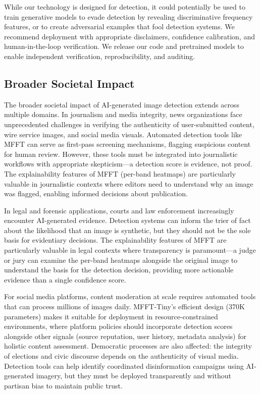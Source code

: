 \documentclass[journal]{IEEEtran}
\begin{document}
While our technology is designed for detection, it could potentially be used to train generative models to evade detection by revealing discriminative frequency features, or to create adversarial examples that fool detection systems. We recommend deployment with appropriate disclaimers, confidence calibration, and human-in-the-loop verification. We release our code and pretrained models to enable independent verification, reproducibility, and auditing.

\subsection{Broader Societal Impact}
The broader societal impact of AI-generated image detection extends across multiple domains. In journalism and media integrity, news organizations face unprecedented challenges in verifying the authenticity of user-submitted content, wire service images, and social media visuals. Automated detection tools like MFFT can serve as first-pass screening mechanisms, flagging suspicious content for human review. However, these tools must be integrated into journalistic workflows with appropriate skepticism---a detection score is evidence, not proof. The explainability features of MFFT (per-band heatmaps) are particularly valuable in journalistic contexts where editors need to understand why an image was flagged, enabling informed decisions about publication.

In legal and forensic applications, courts and law enforcement increasingly encounter AI-generated evidence. Detection systems can inform the trier of fact about the likelihood that an image is synthetic, but they should not be the sole basis for evidentiary decisions. The explainability features of MFFT are particularly valuable in legal contexts where transparency is paramount---a judge or jury can examine the per-band heatmaps alongside the original image to understand the basis for the detection decision, providing more actionable evidence than a single confidence score.

For social media platforms, content moderation at scale requires automated tools that can process millions of images daily. MFFT-Tiny's efficient design (370K parameters) makes it suitable for deployment in resource-constrained environments, where platform policies should incorporate detection scores alongside other signals (source reputation, user history, metadata analysis) for holistic content assessment. Democratic processes are also affected: the integrity of elections and civic discourse depends on the authenticity of visual media. Detection tools can help identify coordinated disinformation campaigns using AI-generated imagery, but they must be deployed transparently and without partisan bias to maintain public trust.
\end{document}
